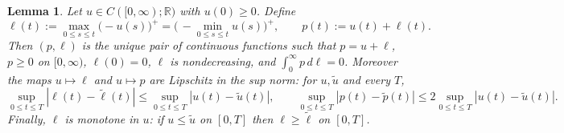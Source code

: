 \documentclass{amsart}
\newtheorem{lemma}{Lemma}
\theoremstyle{definition}
\theoremstyle{remark}
\newcommand{\R}{\mathbb{R}}
\begin{document}
\begin{lemma}\label{lem:1d}
Let $u\in C([0,\infty);\R)$ with $u(0)\ge 0$. Define
\begin{equation}\label{eq:1dmap}
  \ell(t):=\max_{0\le s\le t}\big(-u(s)\big)^+=\Big(\,{-}\!\min_{0\le s\le t}u(s)\Big)^+,
  \qquad p(t):=u(t)+\ell(t).
\end{equation}
Then $(p,\ell)$ is the unique pair of continuous functions such that
$p=u+\ell$, $p\ge0$ on $[0,\infty)$, $\ell(0)=0$, $\ell$ is nondecreasing, and
$\int_0^\infty p\,d\ell=0$. Moreover the maps $u\mapsto\ell$ and $u\mapsto p$
are Lipschitz in the sup norm: for $u,\tilde u$ and every $T$,
\begin{equation}\label{eq:1dlip}
  \sup_{0\le t\le T}|\ell(t)-\tilde\ell(t)|\le \sup_{0\le t\le T}|u(t)-\tilde u(t)|,
  \qquad
  \sup_{0\le t\le T}|p(t)-\tilde p(t)|\le 2\sup_{0\le t\le T}|u(t)-\tilde u(t)|.
\end{equation}
Finally, $\ell$ is monotone in $u$: if $u\le\tilde u$ on $[0,T]$ then
$\ell\ge\tilde\ell$ on $[0,T]$.
\end{lemma}
\end{document}
